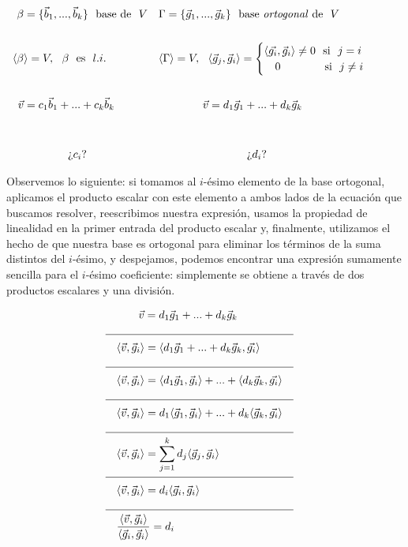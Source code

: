 \documentclass[12pt,dvipsnames]{article}
\numberwithin{equation}{section}
\begin{document}
\begin{align*}
    \beta&=\{\vec{b}_1,...,\vec{b}_k\} \ \ \text{base de} \ \ V& &\Gamma=\{\vec{g}_1,...,\vec{g}_k\} \ \ \text{base \emph{ortogonal} de} \ \ V& & &\\
    \\
    \langle\beta&\rangle = V, \ \ \beta \ \ \text{es} \ \ l.i.& &\langle\Gamma\rangle = V, \ \ \langle \vec{g}_j , \vec{g}_i \rangle = \begin{cases} \langle\vec{g_i}, \vec{g}_i\rangle\neq0 \ \ \text{si} \ \ j = i \\ \quad 0 \quad \ \ \ \ \ \ \ \ \ \text{si} \ \ j\neq i \end{cases}& & &\\
    \\
    \vec{v}&= c_1\vec{b}_1 + ... + c_k\vec{b}_k& &\quad \quad \quad \quad \vec{v}= d_1\vec{g}_1 + ... + d_k\vec{g}_k& & & \\
    \\
    \\
    &\quad \quad \quad \quad \text{¿}c_i\text{?}& & \quad \quad \quad \quad \quad \quad \quad \quad \text{¿}d_i\text{?} & & &
\end{align*}

Observemos lo siguiente: si tomamos al $i$-ésimo elemento de la base ortogonal, aplicamos el producto escalar con este elemento a ambos lados de la ecuación que buscamos resolver, reescribimos nuestra expresión, usamos la propiedad de linealidad en la primer entrada del producto escalar y, finalmente, utilizamos el hecho de que nuestra base es ortogonal para eliminar los términos de la suma distintos del $i$-ésimo, y despejamos, podemos encontrar una expresión sumamente sencilla para el $i$-ésimo coeficiente: simplemente se obtiene a través de dos productos escalares y una división.

\begin{align*}
    & & & \quad \quad \vec{v}= d_1\vec{g}_1 + ... + d_k\vec{g}_k& & & \\
    \cline{1-8}
    & & &\langle \vec{v} , \vec{g}_i \rangle = \langle d_1\vec{g}_1 + ... + d_k\vec{g}_k , \vec{g_i} \rangle& & & \\
    \cline{1-8}
    & & &\langle \vec{v} , \vec{g}_i \rangle = \langle d_1\vec{g}_1,\vec{g}_i\rangle + ... + \langle d_k\vec{g}_k , \vec{g_i} \rangle& & & \\
    \cline{1-8}
    & & &\langle \vec{v} , \vec{g}_i \rangle = d_1\langle \vec{g}_1, \vec{g}_i\rangle + ... + d_k\langle \vec{g}_k , \vec{g_i} \rangle& & & \\
    \cline{1-8}
    & & &\langle \vec{v} , \vec{g}_i \rangle = \sum_{j=1}^k d_j\langle \vec{g}_j, \vec{g}_i\rangle& & & \\
    \cline{1-8}
    & & &\langle \vec{v} , \vec{g}_i \rangle = d_i \langle\vec{g}_i, \vec{g}_i\rangle& & & \\
    \cline{1-8}
    & & &\frac{\langle \vec{v} ,\vec{g}_i \rangle}{\langle\vec{g}_i, \vec{g}_i\rangle} = d_i& & &
\end{align*}
\end{document}
